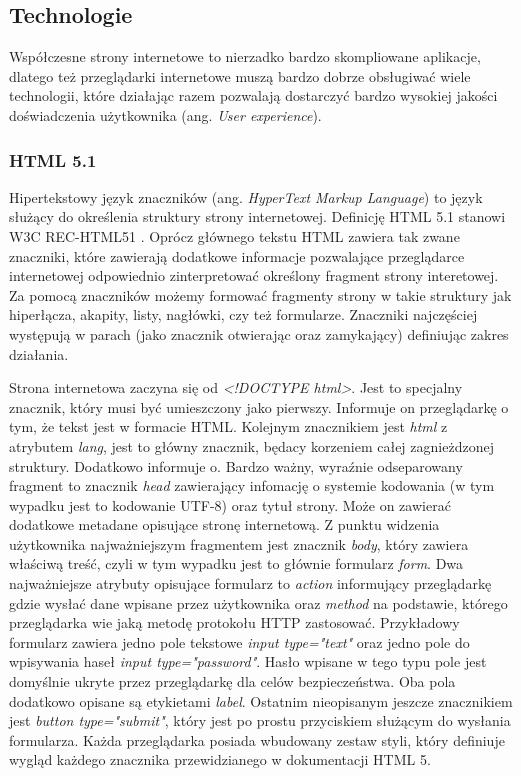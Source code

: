\documentclass[polish, twoside, 12pt]{mwart}
\begin{document}
\subsection{Technologie}

Współczesne strony internetowe to nierzadko bardzo skompliowane aplikacje, dlatego też przeglądarki internetowe muszą bardzo dobrze obsługiwać wiele technologii, które działając razem pozwalają dostarczyć bardzo wysokiej jakości doświadczenia użytkownika (ang. \emph{User experience}). 

\subsubsection{HTML 5.1} \label{html}

Hipertekstowy język znaczników (ang. \emph{HyperText Markup Language}) to język służący do określenia struktury strony internetowej. Definicję HTML 5.1 stanowi W3C REC-HTML51 \cite{w3c-rec-html51}. Oprócz głównego tekstu HTML zawiera tak zwane znaczniki, które zawierają dodatkowe informacje pozwalające przeglądarce internetowej odpowiednio zinterpretować określony fragment strony interetowej. Za pomocą znaczników możemy formować fragmenty strony w takie struktury jak hiperłącza, akapity, listy, nagłówki, czy też formularze. Znaczniki najczęściej występują w parach (jako znacznik otwierając oraz zamykający) definiując zakres działania.



Strona internetowa zaczyna się od \emph{<!DOCTYPE html>}. Jest to specjalny znacznik, który musi być umieszczony jako pierwszy. Informuje on przeglądarkę o tym, że tekst jest w formacie HTML. Kolejnym znacznikiem jest \emph{html} z atrybutem \emph{lang}, jest to główny znacznik, będacy korzeniem całej zagnieżdzonej struktury. Dodatkowo informuje o. Bardzo ważny, wyraźnie odseparowany fragment to znacznik \emph{head} zawierający infomację o systemie kodowania (w tym wypadku jest to  kodowanie UTF-8) oraz tytuł strony. Może on zawierać dodatkowe metadane opisujące stronę internetową. Z punktu widzenia użytkownika najważniejszym fragmentem jest znacznik \emph{body}, który zawiera właściwą treść, czyli w tym wypadku jest to głównie formularz \emph{form}. Dwa najważniejsze atrybuty opisujące formularz to \emph{action} informujący przeglądarkę gdzie wysłać dane wpisane przez użytkownika oraz \emph{method} na podstawie, którego przeglądarka wie jaką metodę protokołu HTTP zastosować. Przykładowy formularz zawiera jedno pole tekstowe \emph{input type="text"} oraz jedno pole do wpisywania haseł \emph{input type="password"}. Hasło wpisane w tego typu pole jest domyślnie ukryte przez przeglądarkę dla celów bezpieczeństwa. Oba pola dodatkowo opisane są etykietami \emph{label}. Ostatnim nieopisanym jeszcze znacznikiem jest \emph{button type="submit"}, który jest po prostu przyciskiem służącym do wysłania formularza. Każda przeglądarka posiada wbudowany zestaw styli, który definiuje wygląd każdego znacznika przewidzianego w dokumentacji HTML 5.
\end{document}
